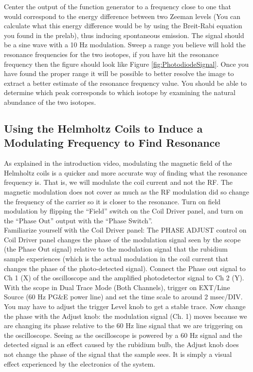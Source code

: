 \documentclass{../lab}
\begin{document}
Center the output of the function generator to a frequency close to one that would correspond to the energy difference between two Zeeman levels (You can calculate what this energy difference would be by using the Breit-Rabi equation you found in the prelab), thus inducing spontaneous emission. The signal should be a sine wave with a 10 Hz modulation. Sweep a range you believe will hold the resonance frequencies for the two isotopes, if you have hit the resonance frequency then the figure should look like Figure \ref{fig:PhotodiodeSignal}. Once you have found the proper range it will be possible to better resolve the image to extract a better estimate of the resonance frequency value. You should be able to determine which peak corresponds to which isotope by examining the natural abundance of the two isotopes.

\subsection{Using the Helmholtz Coils to Induce a Modulating Frequency to Find Resonance}

As explained in the introduction video, modulating the magnetic field of the Helmholtz coils is a quicker and more accurate way of finding what the resonance frequency is. That is, we will modulate the coil current and not the RF. The magnetic modulation does not cover as much as the RF modulation did so change the frequency of the carrier so it is closer to the resonance. Turn on field modulation by flipping the ``Field'' switch on the Coil Driver panel, and turn on the ``Phase Out'' output with the ``Phase Switch''. \\

Familiarize yourself with the Coil Driver panel: The PHASE ADJUST control on Coil Driver panel changes the phase of the modulation signal seen by the scope (the Phase Out signal) relative to the modulation signal that the rubidium sample experiences (which is the actual modulation in the coil current that changes the phase of the photo-detected signal). Connect the Phase out signal to Ch 1 (X) of the oscilloscope and the amplified photodetector signal to Ch 2 (Y). With the scope in Dual Trace Mode (Both Channels), trigger on EXT/Line Source (60 Hz PG\&E power line) and set the time scale to around 2 msec/DIV. You may have to adjust the trigger Level knob to get a stable trace. Now change the phase with the Adjust knob: the modulation signal (Ch. 1) moves because we are changing its phase relative to the 60 Hz line signal that we are triggering on the oscilloscope. Seeing as the oscilloscope is powered by a 60 Hz signal and the detected signal is an effect caused by the rubidium bulb, the Adjust knob does not change the phase of the signal that the sample sees. It is simply a visual effect experienced by the electronics of the system. 
\end{document}
